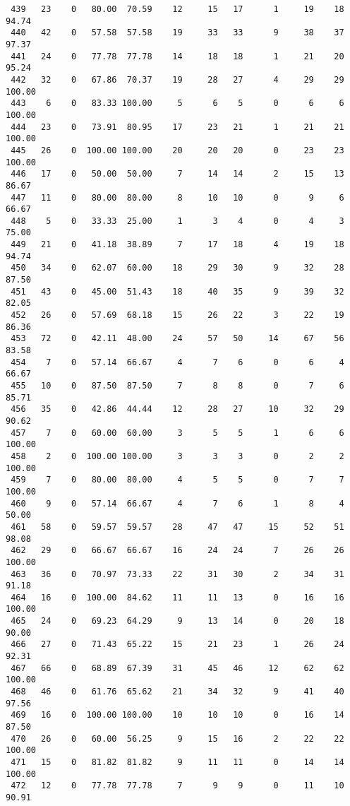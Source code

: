 \begin{verbatim}
 439   23    0   80.00  70.59    12     15   17      1     19    18    94.74
 440   42    0   57.58  57.58    19     33   33      9     38    37    97.37
 441   24    0   77.78  77.78    14     18   18      1     21    20    95.24
 442   32    0   67.86  70.37    19     28   27      4     29    29   100.00
 443    6    0   83.33 100.00     5      6    5      0      6     6   100.00
 444   23    0   73.91  80.95    17     23   21      1     21    21   100.00
 445   26    0  100.00 100.00    20     20   20      0     23    23   100.00
 446   17    0   50.00  50.00     7     14   14      2     15    13    86.67
 447   11    0   80.00  80.00     8     10   10      0      9     6    66.67
 448    5    0   33.33  25.00     1      3    4      0      4     3    75.00
 449   21    0   41.18  38.89     7     17   18      4     19    18    94.74
 450   34    0   62.07  60.00    18     29   30      9     32    28    87.50
 451   43    0   45.00  51.43    18     40   35      9     39    32    82.05
 452   26    0   57.69  68.18    15     26   22      3     22    19    86.36
 453   72    0   42.11  48.00    24     57   50     14     67    56    83.58
 454    7    0   57.14  66.67     4      7    6      0      6     4    66.67
 455   10    0   87.50  87.50     7      8    8      0      7     6    85.71
 456   35    0   42.86  44.44    12     28   27     10     32    29    90.62
 457    7    0   60.00  60.00     3      5    5      1      6     6   100.00
 458    2    0  100.00 100.00     3      3    3      0      2     2   100.00
 459    7    0   80.00  80.00     4      5    5      0      7     7   100.00
 460    9    0   57.14  66.67     4      7    6      1      8     4    50.00
 461   58    0   59.57  59.57    28     47   47     15     52    51    98.08
 462   29    0   66.67  66.67    16     24   24      7     26    26   100.00
 463   36    0   70.97  73.33    22     31   30      2     34    31    91.18
 464   16    0  100.00  84.62    11     11   13      0     16    16   100.00
 465   24    0   69.23  64.29     9     13   14      0     20    18    90.00
 466   27    0   71.43  65.22    15     21   23      1     26    24    92.31
 467   66    0   68.89  67.39    31     45   46     12     62    62   100.00
 468   46    0   61.76  65.62    21     34   32      9     41    40    97.56
 469   16    0  100.00 100.00    10     10   10      0     16    14    87.50
 470   26    0   60.00  56.25     9     15   16      2     22    22   100.00
 471   15    0   81.82  81.82     9     11   11      0     14    14   100.00
 472   12    0   77.78  77.78     7      9    9      0     11    10    90.91

\end{verbatim}
